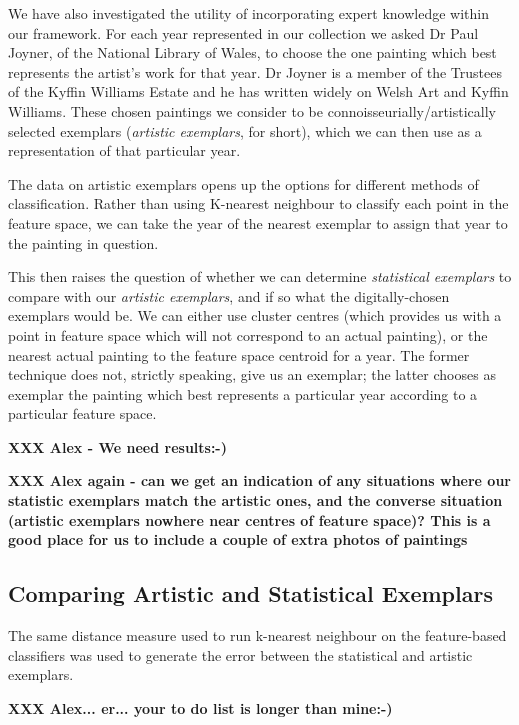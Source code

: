 \documentclass[conference,a4paper]{IEEEtran}
\begin{document}
We have also investigated the utility of incorporating expert knowledge within
our framework. For each year represented in our collection we asked Dr Paul
Joyner, of the National Library of Wales, to choose the one painting which best
represents the artist's work for that year. Dr Joyner is a member of the
Trustees of the Kyffin Williams Estate and he has written widely on Welsh Art
and Kyffin Williams. These chosen paintings we consider to be
connoisseurially/artistically selected exemplars (\emph{artistic exemplars}, for
short), which we can then use as a representation of that particular year.

The data on artistic exemplars opens up the options for different methods of
classification. Rather than using K-nearest neighbour to classify each point in
the feature space, we can take the year of the nearest exemplar to assign that year
to the painting in question. 

This then raises the question of whether we can determine \emph{statistical
exemplars} to compare with our \emph{artistic exemplars}, and if so what the
digitally-chosen exemplars would be.  We can either use cluster centres (which
provides us with a point in feature space which will not correspond to an
actual painting), or the nearest actual painting to the feature space centroid
for a year. The former technique does not, strictly speaking, give us an
exemplar; the latter chooses as exemplar the painting which best represents a
particular year according to a particular feature space. 



\textbf{XXX Alex - We need results:-)}

\textbf{XXX Alex again - can we get an indication of any situations where our statistic exemplars match the artistic ones, and the converse situation (artistic exemplars nowhere near centres of feature space)? This is a good place for us to include a couple of extra photos of paintings}

\subsection{Comparing Artistic and Statistical Exemplars}

The same distance measure used to run k-nearest neighbour on the feature-based classifiers was
used to generate the error between the statistical and artistic exemplars.

\textbf{XXX Alex... er... your to do list is longer than mine:-)}
\end{document}
